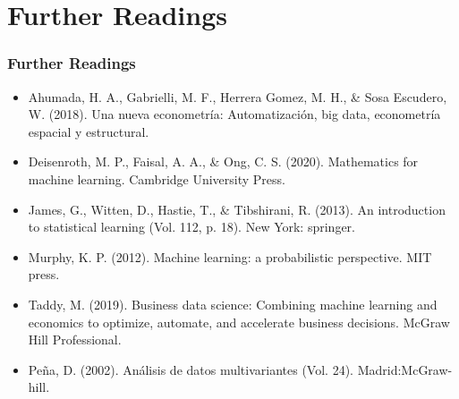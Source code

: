 \documentclass[
  shownotes,
  xcolor={svgnames},
  hyperref={colorlinks,citecolor=DarkBlue,linkcolor=DarkRed,urlcolor=DarkBlue}
  , aspectratio=169]{beamer}
\begin{document}
\section{Further Readings}
\begin{frame}
\frametitle{Further Readings}

\begin{itemize}
  
  
  \item Ahumada, H. A., Gabrielli, M. F., Herrera Gomez, M. H., \& Sosa Escudero, W. (2018). Una nueva econometría: Automatización, big data, econometría espacial y estructural.
  \medskip
  \item  Deisenroth, M. P., Faisal, A. A., \& Ong, C. S. (2020). Mathematics for machine learning. Cambridge University Press.
  \medskip
  \item James, G., Witten, D., Hastie, T., \& Tibshirani, R. (2013). An introduction to statistical learning (Vol. 112, p. 18). New York: springer.
  \medskip
  \item Murphy, K. P. (2012). Machine learning: a probabilistic perspective.    MIT press.
  \medskip
  \item Taddy, M. (2019). Business data science: Combining machine learning and economics to optimize, automate, and accelerate business decisions. McGraw Hill Professional.
  \medskip
  \item   Peña, D. (2002). Análisis de datos multivariantes (Vol. 24). Madrid:McGraw-hill.

\end{itemize}

\end{frame}
\end{document}
